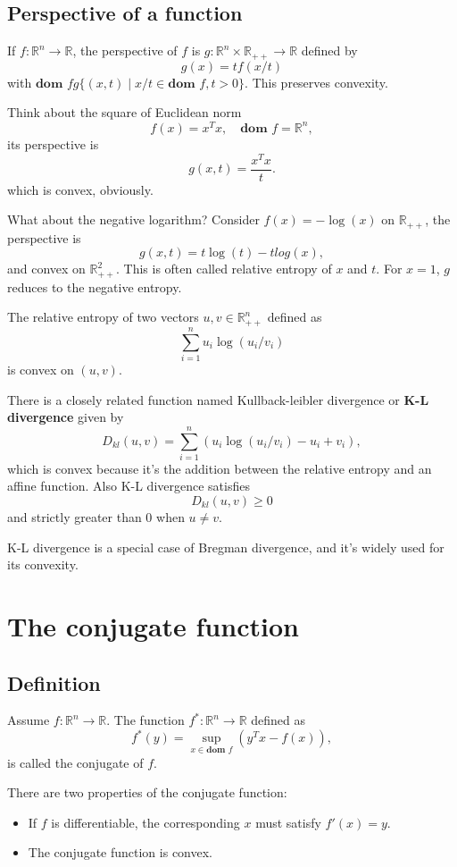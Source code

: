 \documentclass[lang=en,color=blue,mode=fancy,titlestyle=hang]{elegantbook}
\begin{document}
\subsection{Perspective of a function}
If $f: \mathbb{R}^n \rightarrow \mathbb{R}$, the perspective of $f$ is
$g: \mathbb{R}^n \times \mathbb{R}_{++} \rightarrow \mathbb{R}$ defined by
\[
g(x) = tf(x/t)
\]
with $\textbf{dom } f g\{ (x, t) \;|\; x/t \in \textbf{dom } f, t > 0 \}$. This preserves
convexity.

Think about the square of Euclidean norm
\[
f(x) = x^T x, \quad \textbf{dom } f = \mathbb{R}^n,
\]
its perspective is
\[
g(x, t) = \frac{x^T x}{t}.
\]
which is convex, obviously.

What about the negative logarithm? Consider $f(x) = -\log(x)$ on $\mathbb{R}_{++}$, the
perspective is
\[
g(x, t) = t\log(t) - tlog(x),
\]
and convex on $\mathbb{R}^2_{++}$. This is often called relative entropy of $x$ and $t$.
For $x = 1$, $g$ reduces to the negative entropy.

The relative entropy of two vectors $u, v \in \mathbb{R}^n_{++}$ defined as
\[
\sum_{i = 1}^n u_i \log(u_i/v_i)
\]
is convex on $(u, v)$.

There is a closely related function named Kullback-leibler divergence or
\textbf{K-L divergence} given by
\[
D_{kl}(u, v) = \sum_{i = 1}^{n} (u_i \log(u_i/v_i) - u_i + v_i),
\]
which is convex because it's the addition between the relative entropy and an affine
function. Also K-L divergence satisfies
\[
D_{kl}(u, v) \geq 0
\]
and strictly greater than 0 when $u \neq v$.

K-L divergence is a special case of Bregman divergence, and it's widely used for its
convexity.

\section{The conjugate function}
\subsection{Definition}

Assume $f: \mathbb{R}^n \rightarrow \mathbb{R}$. The function
$f^*: \mathbb{R}^n \rightarrow \mathbb{R}$ defined as
\[
f^*(y) = \sup_{x \in \textbf{dom } f} (y^T x - f(x)),
\]
is called the conjugate of $f$.

There are two properties of the conjugate function:
\begin{itemize}
  \item If $f$ is differentiable, the corresponding $x$ must satisfy $f'(x) = y$.
  \item The conjugate function is convex.
\end{itemize}
\end{document}
